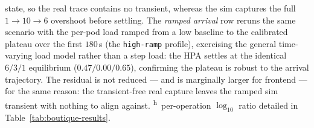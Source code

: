 \documentclass[ASNA,twocolumn]{USG}
\begin{document}
    state, so the real trace contains no transient, whereas the sim
    captures the full $1\to 10\to 6$ overshoot before settling. The
    \emph{ramped arrival} row reruns the same scenario with the per-pod
    load ramped from a low baseline to the calibrated plateau over the
    first $180\,$s (the \texttt{high-ramp} profile), exercising the
    general time-varying load model rather than a step load: the HPA
    settles at the identical $6/3/1$ equilibrium ($0.47/0.00/0.65$),
    confirming the plateau is robust to the arrival trajectory. The
    residual is not reduced --- and is marginally larger for frontend
    --- for the same reason: the transient-free real capture leaves the
    ramped sim transient with nothing to align against.
    \textsuperscript{h}~per-operation $\log_{10}$ ratio detailed in
    Table~\ref{tab:boutique-results}.
\end{document}
